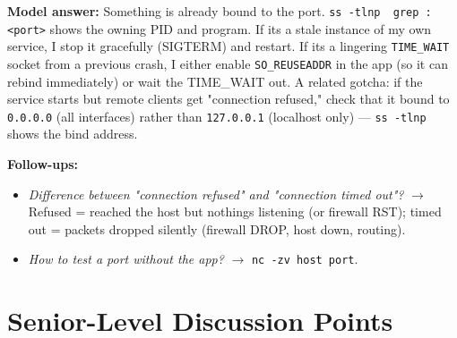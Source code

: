 \documentclass[11pt]{article}
\providecommand{\tightlist}{\setlength{\itemsep}{1pt}\setlength{\parskip}{0pt}}
\begin{document}
\textbf{Model answer:} Something is already bound to the port. \texttt{ss\ -tlnp\ \textbar{}\ grep\ :\textless{}port\textgreater{}} shows the owning PID and program. If it\textquotesingle s a stale instance of my own service, I stop it gracefully (SIGTERM) and restart. If it\textquotesingle s a lingering \texttt{TIME\_WAIT} socket from a previous crash, I either enable \texttt{SO\_REUSEADDR} in the app (so it can rebind immediately) or wait the TIME\_WAIT out. A related gotcha: if the service starts but remote clients get "connection refused," check that it bound to \texttt{0.0.0.0} (all interfaces) rather than \texttt{127.0.0.1} (localhost only) --- \texttt{ss\ -tlnp} shows the bind address.

\textbf{Follow-ups:}

\begin{itemize}
\tightlist
\item
  \emph{Difference between "connection refused" and "connection timed out"?} \(\rightarrow\) Refused = reached the host but nothing\textquotesingle s listening (or firewall RST); timed out = packets dropped silently (firewall DROP, host down, routing).
\item
  \emph{How to test a port without the app?} \(\rightarrow\) \texttt{nc\ -zv\ host\ port}.
\end{itemize}

\section{Senior-Level Discussion Points}\label{senior-level-discussion-points}
\end{document}
